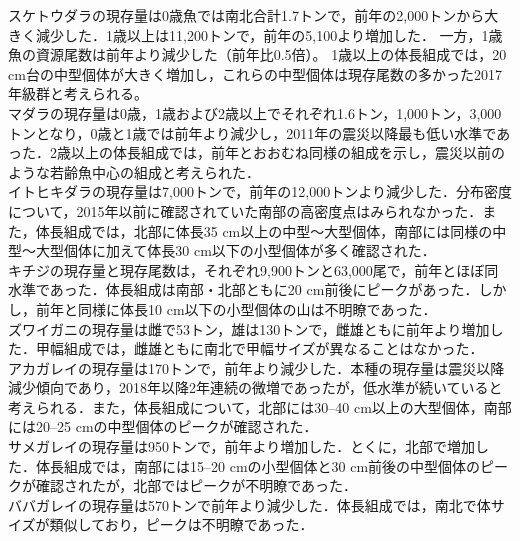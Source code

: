 \documentclass[12pt]{article}
\begin{document}
スケトウダラの現存量は0歳魚では南北合計1.7トンで，前年の2,000トンから大きく減少した．1歳以上は11,200トンで，前年の5,100より増加した．
一方，1歳魚の資源尾数は前年より減少した（前年比0.5倍）。
1歳以上の体長組成では，20 cm台の中型個体が大きく増加し，これらの中型個体は現存尾数の多かった2017年級群と考えられる。
\ \\
\hspace{20pt}マダラの現存量は0歳，1歳および2歳以上でそれぞれ1.6トン，1,000トン，3,000トンとなり，0歳と1歳では前年より減少し，2011年の震災以降最も低い水準であった．2歳以上の体長組成では，前年とおおむね同様の組成を示し，震災以前のような若齢魚中心の組成と考えられた．
\ \\
\hspace{20pt}イトヒキダラの現存量は7,000トンで，前年の12,000トンより減少した．分布密度について，2015年以前に確認されていた南部の高密度点はみられなかった．また，体長組成では，北部に体長35 cm以上の中型～大型個体，南部には同様の中型～大型個体に加えて体長30 cm以下の小型個体が多く確認された．
\ \\
\hspace{20pt}キチジの現存量と現存尾数は，それぞれ9,900トンと63,000尾で，前年とほぼ同水準であった．体長組成は南部・北部ともに20 cm前後にピークがあった．しかし，前年と同様に体長10 cm以下の小型個体の山は不明瞭であった．
\ \\
\hspace{20pt}ズワイガニの現存量は雌で53トン，雄は130トンで，雌雄ともに前年より増加した．甲幅組成では，雌雄ともに南北で甲幅サイズが異なることはなかった．
\ \\
\hspace{20pt}アカガレイの現存量は170トンで，前年より減少した．本種の現存量は震災以降減少傾向であり，2018年以降2年連続の微増であったが，低水準が続いていると考えられる．また，体長組成について，北部には30–40 cm以上の大型個体，南部には20–25 cmの中型個体のピークが確認された．
\ \\
\hspace{20pt}サメガレイの現存量は950トンで，前年より増加した．とくに，北部で増加した．体長組成では，南部には15–20 cmの小型個体と30 cm前後の中型個体のピークが確認されたが，北部ではピークが不明瞭であった．
\ \\
\hspace{20pt}ババガレイの現存量は570トンで前年より減少した．体長組成では，南北で体サイズが類似しており，ピークは不明瞭であった．
\ \\
\ \\
\ \\
\end{document}
